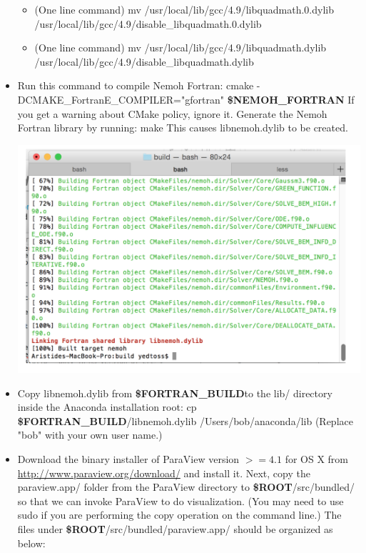 \documentclass[12pt]{article}
\newcommand{\ROOT}{{\textbf{\$ROOT}}}
\newcommand{\NEMOHFORTRAN}{{\textbf{\$NEMOH{\_}FORTRAN}}}
\newcommand{\FORTRANBUILD}{{\textbf{\$FORTRAN{\_}BUILD}}}
\begin{document}
\begin{itemize}
					\begin{itemize}
						\item (One line command)
						{ \color{blue} mv /usr/local/lib/gcc/4.9/libquadmath.0.dylib /usr/local/lib/gcc/4.9/disable{\_}libquadmath.0.dylib}
						\item (One line command)
						mv /usr/local/lib/gcc/4.9/libquadmath.dylib /usr/local/lib/gcc/4.9/disable{\_}libquadmath.dylib
					\end{itemize}
					
					
					
					
					\item Run this command to compile Nemoh Fortran:
					{ \color{blue}cmake  -DCMAKE{\_}FortranE{\_}COMPILER="gfortran" \NEMOHFORTRAN}
					If you get a warning about CMake policy, ignore it.
					Generate the Nemoh Fortran library by running:
					make
					This causes libnemoh.dylib to be created.
					
						\vspace{\abovedisplayskip}
						\begin{minipage}{\linewidth}
							\centering
							\includegraphics[scale=0.75]{img/14}
						\end{minipage}
					\vspace{\belowdisplayskip}
					
					
					\item  Copy libnemoh.dylib from \FORTRANBUILD to the lib/ directory inside the Anaconda installation root:
						{ \color{blue}cp \FORTRANBUILD/libnemoh.dylib  /Users/bob/anaconda/lib}
					(Replace "bob" with your own user name.)
					
					
					\item Download the binary installer of ParaView version $>=4.1$ for OS X from \url{http://www.paraview.org/download/}  and install it.
					Next, copy the paraview.app/ folder from the ParaView directory to \ROOT/src/bundled/ so that we can invoke ParaView to do visualization.  (You may need to use sudo if you are performing the copy operation on the command line.) The files under \ROOT/src/bundled/paraview.app/ should be organized as below:
					

\end{itemize}
\end{document}
